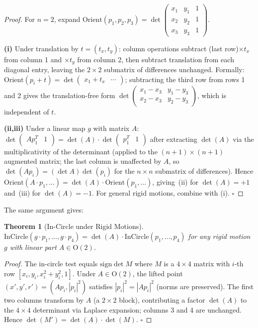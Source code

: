 \documentclass[11pt,letterpaper]{article}
\newtheorem{theorem}{Theorem}[section]
\newcommand{\sign}{\mathrm{sign}}
\newcommand{\Orient}{\mathrm{Orient}}
\newcommand{\InCircle}{\mathrm{InCircle}}
\begin{document}
\begin{proof}
For $n=2$, expand $\Orient(p_1,p_2,p_3)=\det\!\begin{pmatrix}x_1&y_1&1\\x_2&y_2&1\\x_3&y_3&1\end{pmatrix}$.

\textbf{(i)} Under translation by $t=(t_x,t_y)$: column operations subtract
(last row)$\times t_x$ from column 1 and $\times t_y$ from column 2, then subtract
translation from each diagonal entry, leaving the $2\times 2$ submatrix of differences
unchanged.  Formally: $\Orient(p_i+t)=\det\begin{pmatrix}x_1{+}t_x&\cdots\end{pmatrix}$;
subtracting the third row from rows 1 and 2 gives the translation-free form
$\det\begin{pmatrix}x_1{-}x_3&y_1{-}y_3\\x_2{-}x_3&y_2{-}y_3\end{pmatrix}$, which is
independent of $t$.

\textbf{(ii,iii)} Under a linear map $g$ with matrix $A$:
$\det\begin{pmatrix}Ap_1^T&1\end{pmatrix}=\det(A)\cdot\det\begin{pmatrix}p_1^T&1\end{pmatrix}$
after extracting $\det(A)$ via the multiplicativity of the determinant (applied to the
$(n+1)\times(n+1)$ augmented matrix; the last column is unaffected by $A$, so
$\det(Ap_i)=(\det A)\det(p_i)$ for the $n\times n$ submatrix of differences).
Hence $\Orient(A\cdot p_1,\dots)=\det(A)\cdot\Orient(p_1,\dots)$, giving~(ii) for
$\det(A)=+1$ and~(iii) for $\det(A)=-1$.  For general rigid motions, combine with (i).
$\square$
\end{proof}

The same argument gives:

\begin{theorem}[In-Circle under Rigid Motions]\label{thm:incircle_rigid}
$\InCircle(g\cdot p_1,\dots,g\cdot p_4)=\det(A)\cdot\InCircle(p_1,\dots,p_4)$
for any rigid motion $g$ with linear part $A\in\mathrm{O}(2)$.
\end{theorem}

\begin{proof}
The in-circle test equals $\sign\det M$ where $M$ is a $4\times4$ matrix with
$i$-th row $[x_i, y_i, x_i^2+y_i^2, 1]$.  Under $A\in\mathrm{O}(2)$, the lifted
point $(x',y',r')=(Ap_i,|p_i|^2)$ satisfies $|p_i|^2=|Ap_i|^2$ (norms are preserved).
The first two columns transform by $A$ (a $2\times 2$ block), contributing a factor
$\det(A)$ to the $4\times4$ determinant via Laplace expansion; columns 3 and 4 are
unchanged.  Hence $\det(M')=\det(A)\cdot\det(M)$.  $\square$
\end{proof}
\end{document}
